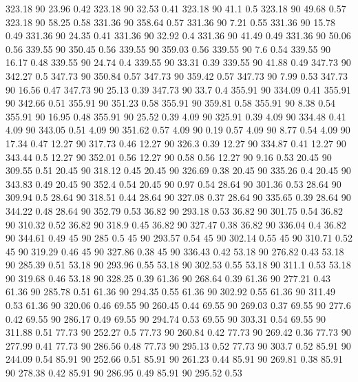 323.18	90	23.96	0.42
323.18	90	32.53	0.41
323.18	90	41.1	0.5
323.18	90	49.68	0.57
323.18	90	58.25	0.58
331.36	90	358.64	0.57
331.36	90	7.21	0.55
331.36	90	15.78	0.49
331.36	90	24.35	0.41
331.36	90	32.92	0.4
331.36	90	41.49	0.49
331.36	90	50.06	0.56
339.55	90	350.45	0.56
339.55	90	359.03	0.56
339.55	90	7.6	0.54
339.55	90	16.17	0.48
339.55	90	24.74	0.4
339.55	90	33.31	0.39
339.55	90	41.88	0.49
347.73	90	342.27	0.5
347.73	90	350.84	0.57
347.73	90	359.42	0.57
347.73	90	7.99	0.53
347.73	90	16.56	0.47
347.73	90	25.13	0.39
347.73	90	33.7	0.4
355.91	90	334.09	0.41
355.91	90	342.66	0.51
355.91	90	351.23	0.58
355.91	90	359.81	0.58
355.91	90	8.38	0.54
355.91	90	16.95	0.48
355.91	90	25.52	0.39
4.09	90	325.91	0.39
4.09	90	334.48	0.41
4.09	90	343.05	0.51
4.09	90	351.62	0.57
4.09	90	0.19	0.57
4.09	90	8.77	0.54
4.09	90	17.34	0.47
12.27	90	317.73	0.46
12.27	90	326.3	0.39
12.27	90	334.87	0.41
12.27	90	343.44	0.5
12.27	90	352.01	0.56
12.27	90	0.58	0.56
12.27	90	9.16	0.53
20.45	90	309.55	0.51
20.45	90	318.12	0.45
20.45	90	326.69	0.38
20.45	90	335.26	0.4
20.45	90	343.83	0.49
20.45	90	352.4	0.54
20.45	90	0.97	0.54
28.64	90	301.36	0.53
28.64	90	309.94	0.5
28.64	90	318.51	0.44
28.64	90	327.08	0.37
28.64	90	335.65	0.39
28.64	90	344.22	0.48
28.64	90	352.79	0.53
36.82	90	293.18	0.53
36.82	90	301.75	0.54
36.82	90	310.32	0.52
36.82	90	318.9	0.45
36.82	90	327.47	0.38
36.82	90	336.04	0.4
36.82	90	344.61	0.49
45	90	285	0.5
45	90	293.57	0.54
45	90	302.14	0.55
45	90	310.71	0.52
45	90	319.29	0.46
45	90	327.86	0.38
45	90	336.43	0.42
53.18	90	276.82	0.43
53.18	90	285.39	0.51
53.18	90	293.96	0.55
53.18	90	302.53	0.55
53.18	90	311.1	0.53
53.18	90	319.68	0.46
53.18	90	328.25	0.39
61.36	90	268.64	0.39
61.36	90	277.21	0.43
61.36	90	285.78	0.51
61.36	90	294.35	0.55
61.36	90	302.92	0.55
61.36	90	311.49	0.53
61.36	90	320.06	0.46
69.55	90	260.45	0.44
69.55	90	269.03	0.37
69.55	90	277.6	0.42
69.55	90	286.17	0.49
69.55	90	294.74	0.53
69.55	90	303.31	0.54
69.55	90	311.88	0.51
77.73	90	252.27	0.5
77.73	90	260.84	0.42
77.73	90	269.42	0.36
77.73	90	277.99	0.41
77.73	90	286.56	0.48
77.73	90	295.13	0.52
77.73	90	303.7	0.52
85.91	90	244.09	0.54
85.91	90	252.66	0.51
85.91	90	261.23	0.44
85.91	90	269.81	0.38
85.91	90	278.38	0.42
85.91	90	286.95	0.49
85.91	90	295.52	0.53
